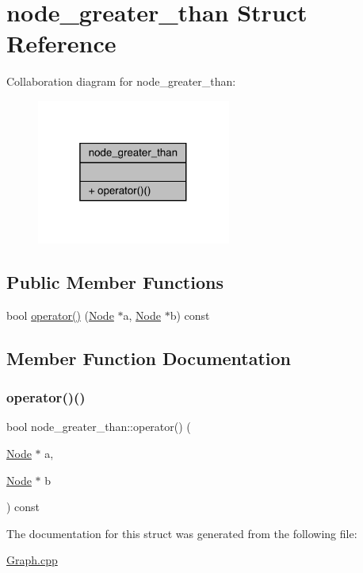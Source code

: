 \hypertarget{structnode__greater__than}{}\section{node\+\_\+greater\+\_\+than Struct Reference}
\label{structnode__greater__than}


Collaboration diagram for node\+\_\+greater\+\_\+than\+:
\nopagebreak
\begin{figure}[H]
\begin{center}
\leavevmode
\includegraphics[width=181pt]{structnode__greater__than__coll__graph}
\end{center}
\end{figure}
\subsection*{Public Member Functions}
\begin{DoxyCompactItemize}
\item 
bool \hyperlink{structnode__greater__than_ac91d8c047b4c548f2c1ddf95af5a8f6d}{operator()} (\hyperlink{class_node}{Node} $\ast$a, \hyperlink{class_node}{Node} $\ast$b) const
\end{DoxyCompactItemize}


\subsection{Member Function Documentation}
\hypertarget{structnode__greater__than_ac91d8c047b4c548f2c1ddf95af5a8f6d}{}\label{structnode__greater__than_ac91d8c047b4c548f2c1ddf95af5a8f6d} 
\subsubsection{\texorpdfstring{operator()()}{operator()()}}
{\footnotesize\ttfamily bool node\+\_\+greater\+\_\+than\+::operator() (\begin{DoxyParamCaption}\item[{\hyperlink{class_node}{Node} $\ast$}]{a,  }\item[{\hyperlink{class_node}{Node} $\ast$}]{b }\end{DoxyParamCaption}) const\hspace{0.3cm}{\ttfamily [inline]}}



The documentation for this struct was generated from the following file\+:\begin{DoxyCompactItemize}
\item 
\hyperlink{_graph_8cpp}{Graph.\+cpp}\end{DoxyCompactItemize}
